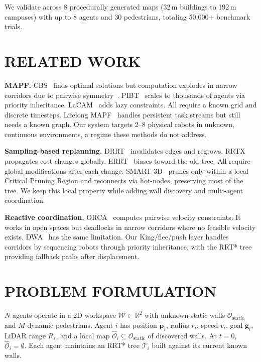 \documentclass[letterpaper, 10pt, conference]{IEEEtran}
\newcommand{\smarttd}{SMART\nobreakdash-3D}
\begin{document}
We validate across 8 procedurally generated maps (32\,m buildings to 192\,m campuses) with up to 8 agents and 30 pedestrians, totaling 50{,}000+ benchmark trials.

\section{RELATED WORK}

\textbf{MAPF.}
CBS~\cite{sharon2015cbs} finds optimal solutions but computation explodes in narrow corridors due to pairwise symmetry~\cite{li2019symmetry}. PIBT~\cite{okumura2022pibt} scales to thousands of agents via priority inheritance. LaCAM~\cite{okumura2023lacam} adds lazy constraints. All require a known grid and discrete timesteps. Lifelong MAPF~\cite{li2021lifelong} handles persistent task streams but still needs a known graph. Our system targets 2--8 physical robots in unknown, continuous environments, a regime these methods do not address.

\textbf{Sampling-based replanning.}
DRRT~\cite{ferguson2006replanning} invalidates edges and regrows. RRTX~\cite{otte2016rrtx} propagates cost changes globally. ERRT~\cite{bruce2002real} biases toward the old tree. All require global modifications after each change. \smarttd{}~\cite{agrawal2025smart3d} prunes only within a local Critical Pruning Region and reconnects via hot-nodes, preserving most of the tree. We keep this local property while adding wall discovery and multi-agent coordination.

\textbf{Reactive coordination.}
ORCA~\cite{berg2011reciprocal} computes pairwise velocity constraints. It works in open spaces but deadlocks in narrow corridors where no feasible velocity exists. DWA~\cite{fox1997dwa} has the same limitation. Our King/flee/push layer handles corridors by sequencing robots through priority inheritance, with the RRT* tree providing fallback paths after displacement.

\section{PROBLEM FORMULATION}

$N$ agents operate in a 2D workspace $\mathcal{W} \subset \mathbb{R}^2$ with unknown static walls $\mathcal{O}_{\text{static}}$ and $M$ dynamic pedestrians. Agent $i$ has position $\mathbf{p}_i$, radius $r_i$, speed $v_i$, goal $\mathbf{g}_i$, LiDAR range $R_s$, and a local map $\hat{\mathcal{O}}_i \subseteq \mathcal{O}_{\text{static}}$ of discovered walls. At $t{=}0$, $\hat{\mathcal{O}}_i = \emptyset$. Each agent maintains an RRT* tree $\mathcal{T}_i$ built against its current known walls.
\end{document}
